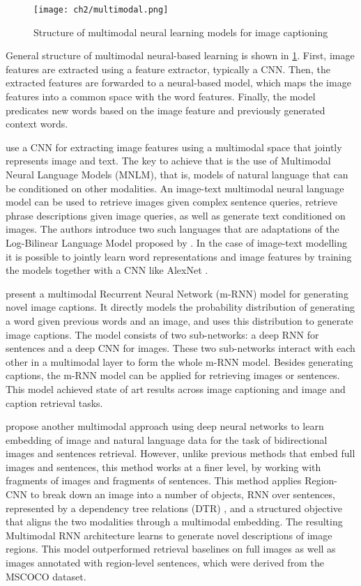 \begin{figure}[hpt]
	\centering
	\texttt{[image: ch2/multimodal.png]}
	\caption{Structure of multimodal neural learning models for image captioning}
	\label{fig:multimodal}
\end{figure}

General structure of multimodal neural-based learning is shown in \cref{fig:multimodal}. First, image features are extracted using a feature extractor, typically a CNN. Then, the extracted features are forwarded to a neural-based model, which maps the image features into a common space with the word features. Finally, the model predicates new words based on the image feature and previously generated context words.

\citet{Kiros2014a} use a CNN for extracting image features using a multimodal space that jointly represents image and text. The key to achieve that is the use of Multimodal Neural Language Models (MNLM), that is, models of natural language that can be conditioned on other modalities. An image-text multimodal neural language model can be used to retrieve images given complex sentence queries, retrieve phrase descriptions given image queries, as well as generate text conditioned on images. The authors introduce two such languages that are adaptations of the Log-Bilinear Language Model proposed by \citet{Mnih2007}. In the case of image-text modelling it is possible to jointly learn word representations and image features by training the models together with a CNN like AlexNet \citep{Krizhevsky2012}.

\citet{Mao2014, Mao2015_mRNN} present a multimodal Recurrent Neural Network (m-RNN) model for generating novel image captions. It directly models the probability distribution of generating a word given previous words and an image, and uses this distribution to generate image captions. The model consists of two sub-networks: a deep RNN for sentences and a deep CNN for images. These two sub-networks interact with each other in a multimodal layer to form the whole m-RNN model. Besides generating captions, the m-RNN model can be applied for retrieving images or sentences. This model achieved state of art results across image captioning and image and caption retrieval tasks.

\citet{Karpathy2015} propose another multimodal approach using deep neural networks to learn embedding of image and natural language data for the task of bidirectional images and sentences retrieval. However, unlike previous methods that embed full images and sentences, this method works at a finer level, by working with fragments of images and fragments of sentences. This method applies Region-CNN to break down an image into a number of objects, RNN over sentences, represented by a dependency tree relations (DTR) \citep{DeMarneffe2006}, and a structured objective that aligns the two modalities through a multimodal embedding. The resulting Multimodal RNN architecture learns to generate novel descriptions of image regions. This model outperformed retrieval baselines on full images as well as images annotated with region-level sentences, which were derived from the MSCOCO dataset.
 
